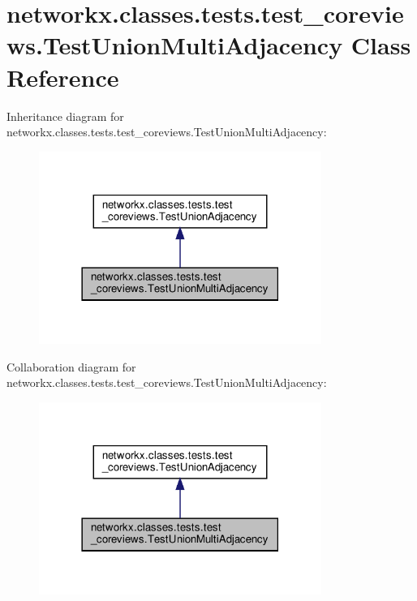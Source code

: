 \hypertarget{classnetworkx_1_1classes_1_1tests_1_1test__coreviews_1_1TestUnionMultiAdjacency}{}\section{networkx.\+classes.\+tests.\+test\+\_\+coreviews.\+Test\+Union\+Multi\+Adjacency Class Reference}
\label{classnetworkx_1_1classes_1_1tests_1_1test__coreviews_1_1TestUnionMultiAdjacency}


Inheritance diagram for networkx.\+classes.\+tests.\+test\+\_\+coreviews.\+Test\+Union\+Multi\+Adjacency\+:
\nopagebreak
\begin{figure}[H]
\begin{center}
\leavevmode
\includegraphics[width=261pt]{classnetworkx_1_1classes_1_1tests_1_1test__coreviews_1_1TestUnionMultiAdjacency__inherit__graph}
\end{center}
\end{figure}


Collaboration diagram for networkx.\+classes.\+tests.\+test\+\_\+coreviews.\+Test\+Union\+Multi\+Adjacency\+:
\nopagebreak
\begin{figure}[H]
\begin{center}
\leavevmode
\includegraphics[width=261pt]{classnetworkx_1_1classes_1_1tests_1_1test__coreviews_1_1TestUnionMultiAdjacency__coll__graph}
\end{center}
\end{figure}
